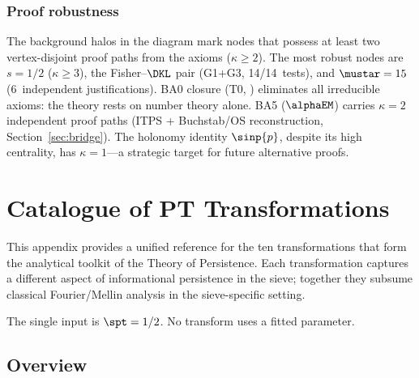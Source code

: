 \documentclass[12pt,a4paper]{article}
\begin{document}
\subsubsection*{Proof robustness}
\label{sec:app_h_robustness}

The background halos in the diagram mark nodes that possess
at least two vertex-disjoint proof paths from the axioms
($\kappa \geq 2$).
The most robust nodes are
$s = 1/2$ ($\kappa \geq 3$), the Fisher--$\DKL$ pair
(G1+G3, 14/14~tests), and $\mustar = 15$ (6~independent
justifications).  BA0 closure (T0, \cite{companion_M3}) eliminates all
irreducible axioms: the theory rests on number theory alone.
BA5 ($\alphaEM$) carries $\kappa = 2$ independent proof paths
(ITPS + Buchstab/OS reconstruction, Section~\ref{sec:bridge}).
The holonomy identity $\sinp{p}$, despite
its high centrality,
has $\kappa = 1$---a strategic target for future
alternative proofs.


\newpage


\section{Catalogue of PT Transformations}
\label{app:transformations}

This appendix provides a unified reference for the ten
transformations that form the analytical toolkit of
the Theory of Persistence.  Each transformation captures a different
aspect of informational persistence in the sieve; together
they subsume classical Fourier/Mellin analysis in the
sieve-specific setting.

The single input is $\spt = 1/2$.  No transform uses a
fitted parameter.

\subsection*{Overview}
\end{document}
